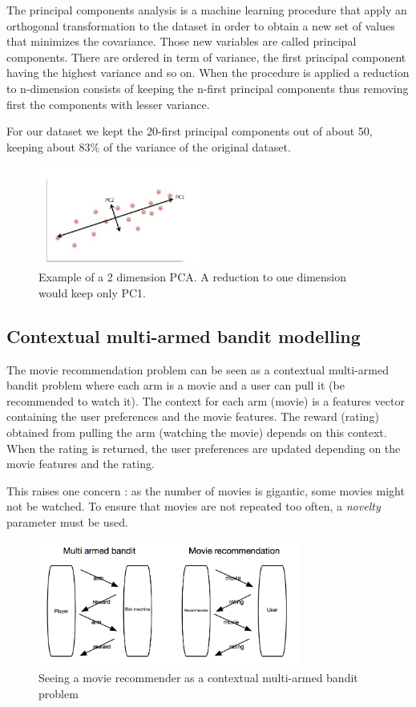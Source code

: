 \documentclass[letterpaper]{article}
\begin{document}
The principal components analysis is a machine learning procedure that apply an orthogonal transformation to the dataset in order to obtain a new set of values that minimizes the covariance. Those new variables are called principal components. There are ordered in term of variance, the first principal component having the highest variance and so on. When the procedure is applied a reduction to n-dimension consists of keeping the n-first principal components thus removing first the components with lesser variance.

For our dataset we kept the 20-first principal components out of about 50, keeping about 83\% of the variance of the original dataset.

\begin{figure}[H]
\begin{center}
\includegraphics[width=2.1in]{img/pca.png}
\caption{Example of a 2 dimension PCA. A reduction to one dimension would keep only PC1.}
\label{pca}
\end{center}
\end{figure}

\subsection{Contextual multi-armed bandit modelling}

The movie recommendation problem can be seen as a contextual multi-armed bandit problem where each arm is a movie and a user can pull it (be recommended to watch it). The context for each arm (movie) is a features vector containing the user preferences and the movie features. The reward (rating) obtained from pulling the arm (watching the movie) depends on this context. When the rating is returned, the user preferences are updated depending on the movie features and the rating.

This raises one concern : as the number of movies is gigantic, some movies might not be watched. To ensure that movies are not repeated too often, a \textit{novelty} parameter must be used.

\begin{figure}[H]
\begin{center}
\includegraphics[width=3.4in]{img/schema.png}
\caption{Seeing a movie recommender as a contextual multi-armed bandit problem}
\label{schema}
\end{center}
\end{figure}
\end{document}
